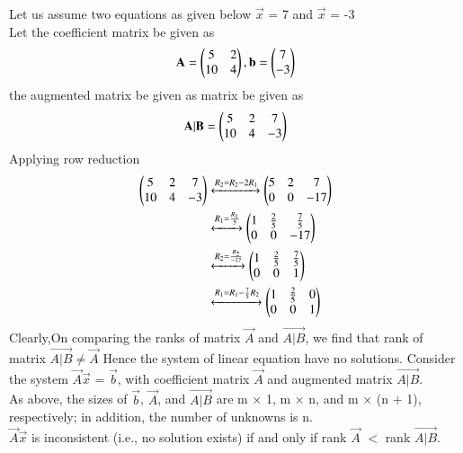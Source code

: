  Let us assume two equations as given below 
 $\vec{x}$ = 7 and $\vec{x}$ = -3 \\
 
 Let the coefficient matrix be given as
 \begin{align}
 \mathbf{A}=\begin{pmatrix}5&2\\10&4\end{pmatrix},\mathbf{b}=\begin{pmatrix}7\\-3\end{pmatrix}
  \end{align}
   the  augmented matrix be given as matrix be given as
  \begin{align}
      \mathbf{A|B} = \begin{pmatrix}5&2&7\\10&4&-3\end{pmatrix}
  \end{align}
  Applying row reduction 
\begin{align}
\begin{pmatrix}5&2&7\\10&4&-3\end{pmatrix}&\xleftrightarrow{R_2=R_2-2R_1}\begin{pmatrix}5&2&7\\0&0&-17\end{pmatrix}\\
&\xleftrightarrow{R_1=\frac{R_1}{5}}\begin{pmatrix}1&\frac{2}{5}&\frac{7}{5}\\0&0&-17\end{pmatrix}\\
&\xleftrightarrow{R_2=\frac{R_2}{-17}}\begin{pmatrix}1&\frac{2}{5}&\frac{7}{5}\\0&0&1\end{pmatrix}\\
&\xleftrightarrow{R_1=R_1-\frac{7}{5}R_2}\begin{pmatrix}1&\frac{2}{5}&0\\0&0&1\end{pmatrix}\\
\end{align}
Clearly,On comparing the ranks of matrix $\vec{A}$ and $\vec{A|B}$, we find that rank of matrix  $\vec{A|B} \neq \vec{A}$
Hence the system of linear equation have no solutions.
Consider the system $\vec{A}$$\vec{x}$ = $\vec{b}$, with coefficient matrix $\vec{A}$ and augmented matrix $\vec{A|B}$.\\
As above, the sizes of $\vec{b}$, $\vec{A}$, and $\vec{A|B}$ are m × 1, m × n, and
m × (n + 1), respectively; in addition, the number of unknowns is n.\\
$\vec{A}$$\vec{x}$ is inconsistent (i.e., no solution exists) if and only if rank $\vec{A}$ $<$ rank $\vec{A|B}$.


 
